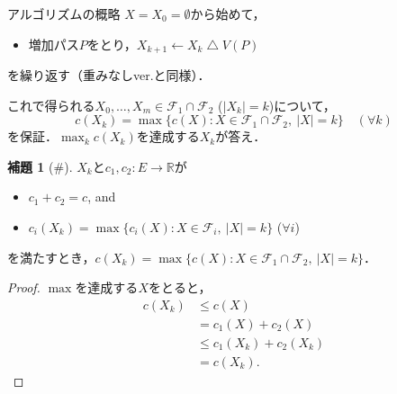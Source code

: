 \documentclass[xelatex,ja=standard,a4paper,14pt,everyparhook=compat]{bxjsarticle}
\newcommand{\bbR}{\mathbb{R}}
\newcommand{\mcF}{\mathcal{F}}
\theoremstyle{definition}
\newtheorem*{lemma*}{補題}
\begin{document}
\newpage

\begin{itembox}[l]{アルゴリズムの概略}
    $X = X_0 = \emptyset$から始めて， \begin{itemize}
        \item 増加パス$P$をとり，$X_{k+1} \gets X_k \mathbin{\bigtriangleup} V(P)$
    \end{itemize}
    を繰り返す（重みなしver.と同様）．

    これで得られる$X_0,\ldots,X_m \in \mcF_1 \cap \mcF_2$ ($|X_k| = k$)について， \begin{equation*}
        c(X_k) = \max \{c(X) : X \in \mcF_1 \cap \mcF_2,\ |X| = k\} \quad (\forall k)
    \end{equation*}
    を保証．$\max_k c(X_k)$を達成する$X_k$が答え．
\end{itembox}

\begin{lemma*}[\#]
    $X_k$と$c_1,c_2 : E \to \bbR$が \begin{itemize}
        \item $c_1 + c_2 = c$, and
        \item $c_i(X_k) = \max \{c_i(X) : X \in \mcF_i,\ |X| = k\}$ ($\forall i$)
    \end{itemize}
    を満たすとき，$c(X_k) = \max \{c(X) : X \in \mcF_1 \cap \mcF_2,\ |X| = k\}$．
\end{lemma*}
\begin{proof}
    $\max$を達成する$X$をとると， \begin{align*}
        c(X_k) &\leq c(X) \\
        &= c_1(X) + c_2(X) \\
        &\leq c_1(X_k) + c_2(X_k) \\
        &= c(X_k).
    \end{align*}
\end{proof}

\newpage
\end{document}
